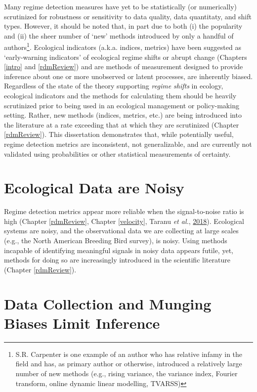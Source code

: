 \documentclass[12pt,twoside,openany]{reedthesis}
\begin{document}
Many regime detection measures have yet to be statistically (or numerically) scrutinized for robustness or sensitivity to data quality, data quantitaty, and shift types. However, it should be noted that, in part due to both (i) the popularity and (ii) the sheer number of `new' methods introduced by only a handful of authors\footnote{S.R. Carpenter is one example of an author who has relative infamy in the field and has, as primary author or otherwise, introduced a relatively large number of new methods (e.g., rising variance, the variance index, Fourier transform, online dynamic linear modelling, TVARSS)}. Ecological indicators (a.k.a. indices, metrics) have been suggested as `early-warning indicators' of ecological regime shifts or abrupt change (Chapters \ref{intro} and \ref{rdmReview}) and are methods of measurement designed to provide inference about one or more unobserved or latent processes, are inherently biased. Regardless of the state of the theory supporting \emph{regime shifts} in ecology, ecological indicators and the methods for calculating them should be heavily scrutinized prior to being used in an ecological management or policy-making setting. Rather, new methods (indices, metrics, etc.) are being introduced into the literature at a rate exceeding that at which they are scrutinized (Chapter \ref{rdmReview}). This dissertation demonstrates that, while potentially useful, regime detection metrics are inconsistent, not generalizable, and are currently not validated using probabilities or other statistical measurements of certainty.

\hypertarget{ecological-data-are-noisy}{%
\section{Ecological Data are Noisy}\label{ecological-data-are-noisy}}

Regime detection metrics appear more reliable when the signal-to-noise ratio is high (Chapter \ref{rdmReview}, Chapter \ref{velocity}, Taranu \emph{et al.}, \protect\hyperlink{ref-taranu2018can}{2018}). Ecological systems are noisy, and the observational data we are collecting at large scales (e.g., the North American Breeding Bird survey), is noisy. Using methods incapable of identifying meaningful signals in noisy data appears futile, yet, methods for doing so are increasingly introduced in the scientific literature (Chapter \ref{rdmReview}).

\hypertarget{data-collection-and-munging-biases-limit-inference}{%
\section{Data Collection and Munging Biases Limit Inference}\label{data-collection-and-munging-biases-limit-inference}}
\end{document}
